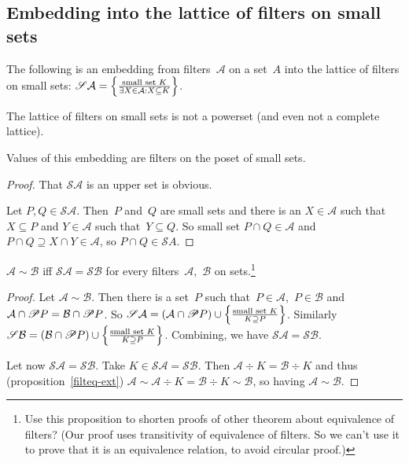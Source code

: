 \subsection{Embedding into the lattice of filters on small sets}

The following is an embedding from filters~$\mathcal{A}$
on a set~$A$ into the lattice of filters on small sets:
$\mathscr{S}\mathcal{A}=\left\{ \frac{\text{small set }K}{
\exists X\in\mathcal{A}:X\subseteq K}\right\}$.

\begin{note}
The lattice of filters on small sets is not a powerset (and
even not a complete lattice).
\end{note}

\begin{prop}
Values of this embedding are filters on the poset of small
sets.
\end{prop}

\begin{proof}
That $\mathscr{S}\mathcal{A}$ is an upper set is obvious.

Let $P,Q\in\mathscr{S}\mathcal{A}$. Then~$P$ and~$Q$ are
small sets and there is an $X\in\mathcal{A}$ such
that~$X\subseteq P$ and $Y\in\mathcal{A}$ such
that~$Y\subseteq Q$. So small set $P\cap Q\in\mathcal{A}$
and $P\cap Q\supseteq X\cap Y\in\mathcal{A}$, so
$P\cap Q\in\mathscr{S}A$.
\end{proof}

\begin{prop}
$\mathcal{A}\sim\mathcal{B}$ iff
$\mathscr{S}\mathcal{A}=\mathscr{S}\mathcal{B}$ for every
filters~$\mathcal{A}$,~$\mathcal{B}$ on sets.\footnote{Use this proposition to shorten proofs of other
theorem about equivalence of filters? (Our proof
uses transitivity of equivalence of filters. So we can't
use it to prove that it is an equivalence relation, to avoid circular proof.)}
\end{prop}

\begin{proof}
Let $\mathcal{A}\sim\mathcal{B}$. Then there is a set~$P$
such that~$P\in\mathcal{A}$,~$P\in\mathcal{B}$ and
$\mathcal{A}\cap\mathscr{P} P=\mathcal{B}\cap\mathscr{P} P$.
So $\mathscr{S}\mathcal{A} = (\mathcal{A}\cap\mathscr{P} P)\cup
\left\{ \frac{\text{small set }K}{K\supseteq P}\right\}$.
Similarly
$\mathscr{S}\mathcal{B} = (\mathcal{B}\cap\mathscr{P} P)\cup
\left\{ \frac{\text{small set }K}{K\supseteq P}\right\}$.
Combining, we have $\mathscr{S}\mathcal{A}=\mathscr{S}\mathcal{B}$.

Let now $\mathscr{S}\mathcal{A}=\mathscr{S}\mathcal{B}$.
Take $K\in\mathscr{S}\mathcal{A}=\mathscr{S}\mathcal{B}$.
Then $\mathcal{A}\div K=\mathcal{B}\div K$ and thus
(proposition~\ref{filteq-ext})
$\mathcal{A}\sim\mathcal{A}\div K =
\mathcal{B}\div K\sim\mathcal{B}$, so having
$\mathcal{A}\sim\mathcal{B}$.
\end{proof}

